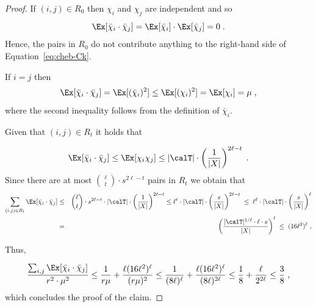\begin{proof}
If $(i,j) \in R_0$ then $\chi_{i}$ and $\chi_{j}$ are independent and so
\begin{equation}\label{eq:cheb-Ck-case1}
\Ex[\bar{\chi}_{i}\cdot \bar{\chi}_{j}] =  \Ex[\bar{\chi}_{i}]\cdot \Ex[\bar{\chi}_{j}] = 0\;.
\end{equation}
Hence, the pairs in $R_0$ do not contribute anything to the right-hand side of Equation~\eqref{eq:cheb-Ck}.


If $i = j$ then
\begin{equation}\label{eq:cheb-Ck-case2}
\Ex[\bar{\chi}_{i}\cdot \bar{\chi}_{j}] = \Ex[(\bar{\chi}_{i})^2]
\leq \Ex[(\chi_{i})^2] = \Ex[\chi_{i}] = \mu \;,
\end{equation}
where the second inequality follows from the definition of $\bar{\chi}_{i}$.

Given that $(i,j) \in R_t$ it holds that

\begin{equation}\label{eq:cheb-Ck-case3}
\Ex[\bar{\chi}_{i}\cdot \bar{\chi}_{j}]
\leq \Ex[\chi_{i} \chi_{j}] \leq  |\calT| \cdot \left(\frac{1}{|X|}\right)^{2\ell -t} \;.
\end{equation}
Since there are at most ${\ell \choose t} \cdot s^{2\ell -t}$ pairs in $R_t$ we obtain that
\begin{eqnarray}
\sum_{(i, j)\in R_t}\Ex[\bar{\chi}_{i}\cdot \bar{\chi}_{j}]
&\leq&  {\ell \choose t} \cdot s^{2\ell -t} \cdot |\calT|\cdot   \left(\frac{1}{|X|}\right)^{2\ell -t} \leq \ell^t \cdot |\calT| \cdot \left(\frac{s}{|X|}\right)^{2\ell -t} \;\leq\;  \ell^\ell \cdot |\calT| \cdot   \left(\frac{s}{|X|}\right)^\ell \nonumber\\
&=&  \left( \frac{|\calT|^{1/\ell} \cdot \ell \cdot s}{|X|}\right)^\ell \;\leq\; (16\ell^2)^\ell\;,
\label{eq:cheb-Ck-case4}
\end{eqnarray}

Thus,

\begin{equation}
\frac{\sum_{i,j} \Ex[\bar{\chi}_{i}\cdot \bar{\chi}_{j}]}{r^2\cdot \mu^2}
\leq  \frac{1}{r \mu} + \frac{\ell (16\ell^2)^\ell}{(r \mu)^2} \leq
\frac{1}{(8\ell)^\ell} + \frac{\ell (16\ell^2)^\ell}{(8\ell)^{2\ell}} \leq \frac{1}{8} +  \frac{\ell}{2^{2\ell}} \leq \frac{3}{8}\;,
\end{equation}
which concludes the proof of the claim.  %
\end{proof}


